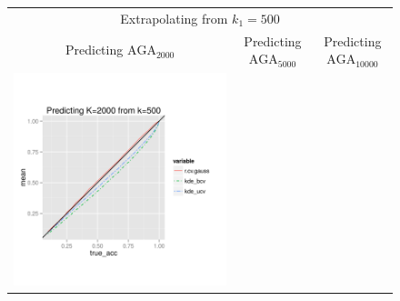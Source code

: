 \documentclass[twoside,11pt]{article}
\newenvironment{myfont}{\fontfamily{phv}\selectfont}{\par}
\begin{document}
\begin{figure}
\centering
\begin{tabular}{ccc}
\multicolumn{3}{c}{\begin{myfont}Extrapolating from $k_1 = 500$\end{myfont}}\\
\begin{myfont}Predicting $\text{AGA}_{2000}$\end{myfont} &
\begin{myfont}Predicting $\text{AGA}_{5000}$\end{myfont} &
\begin{myfont}Predicting $\text{AGA}_{10000}$\end{myfont}\\
\includegraphics[scale = 0.45, clip = true, trim = .0in 0 1.25in 1.03in]{sim_large7_bias_K2_k0_5.png} &

\end{tabular}
\end{figure}
\end{document}

